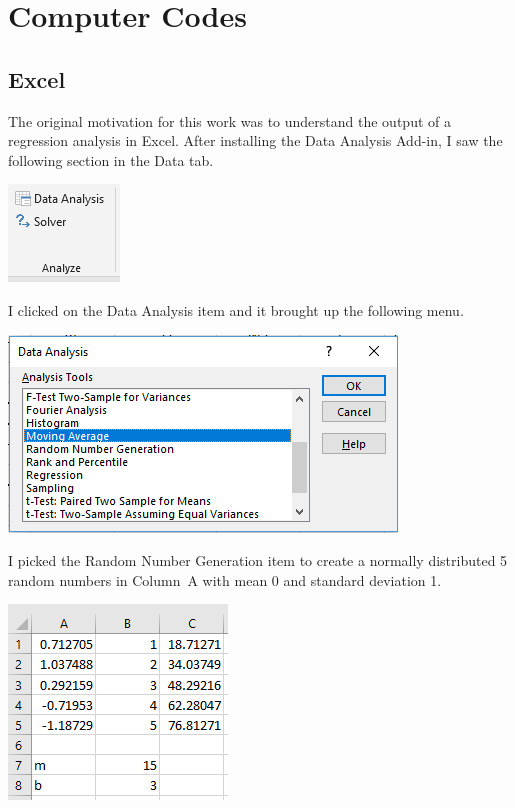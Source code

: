 \documentclass{scrartcl}
\begin{document}
\appendix

\section{Computer Codes}

\subsection{Excel}\label{sec:excel}
The original motivation for this work was to understand
the output of a regression analysis in Excel. After installing
the Data Analysis Add-in, I saw the following section
in the Data tab.
\begin{center}
\includegraphics{analbox}
\end{center}
I clicked on the Data Analysis item and it brought up the following
menu.
\begin{center}
\includegraphics{analmenu}
\end{center}
I picked the Random Number Generation item to create a normally
distributed 5 random numbers in Column~A with mean 0 and standard
deviation 1.

\includegraphics{ABC}
\end{document}
